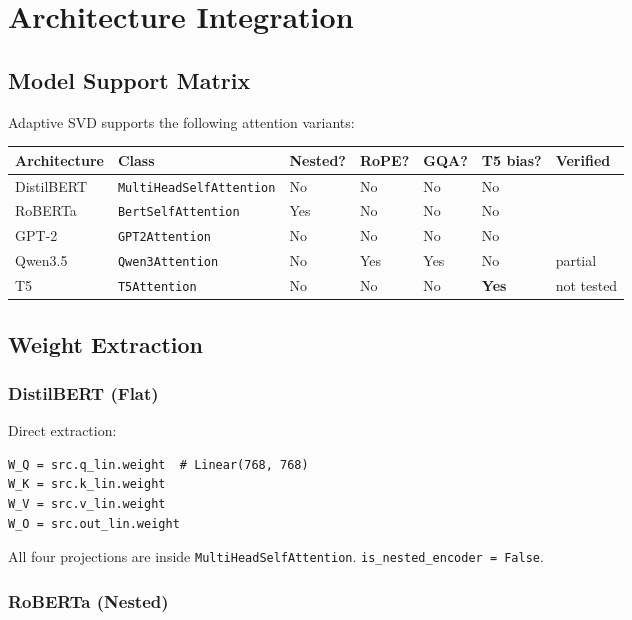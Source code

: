 
\section{Architecture Integration}

\subsection{Model Support Matrix}

Adaptive SVD supports the following attention variants:

\begin{table}[H]
\centering
\small
\begin{tabular}{lllllll}
\toprule
\textbf{Architecture} & \textbf{Class} & \textbf{Nested?} & \textbf{RoPE?} & \textbf{GQA?} & \textbf{T5 bias?} & \textbf{Verified} \\
\midrule
DistilBERT & \texttt{MultiHeadSelfAttention} & No & No & No & No &  \\
RoBERTa & \texttt{BertSelfAttention} & Yes & No & No & No &  \\
GPT-2 & \texttt{GPT2Attention} & No & No & No & No &  \\
Qwen3.5 & \texttt{Qwen3Attention} & No & Yes & Yes & No & partial \\
T5 & \texttt{T5Attention} & No & No & No & \textbf{Yes} & not tested \\
\bottomrule
\end{tabular}
\end{table}

\subsection{Weight Extraction}

\subsubsection{DistilBERT (Flat)}

Direct extraction:

\begin{lstlisting}
W_Q = src.q_lin.weight  # Linear(768, 768)
W_K = src.k_lin.weight
W_V = src.v_lin.weight
W_O = src.out_lin.weight
\end{lstlisting}

All four projections are inside \texttt{MultiHeadSelfAttention}. \texttt{is\_nested\_encoder = False}.

\subsubsection{RoBERTa (Nested)}


